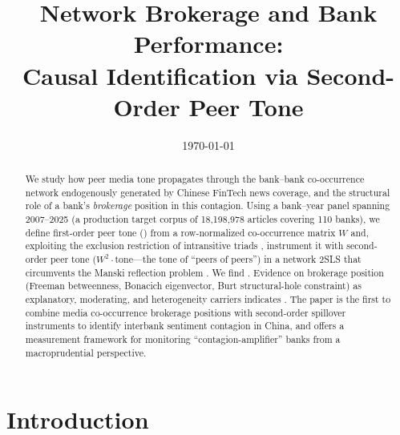 




\title{Network Brokerage and Bank Performance:\\Causal Identification via Second-Order Peer Tone}
\author{}
\date{\today}


\maketitle

\begin{abstract}
We study how peer media tone propagates through the bank--bank
co-occurrence network endogenously generated by Chinese FinTech news
coverage, and the structural role of a bank's \emph{brokerage}
position in this contagion. Using a bank--year panel spanning
2007--2025 (a production target corpus of 18{,}198{,}978 articles
covering 110 banks), we define first-order peer tone
() from a row-normalized co-occurrence
matrix $W$ and, exploiting the exclusion restriction of intransitive
triads \parencite{bramoulle2009identification}, instrument it with
second-order peer tone ($W^{2}\cdot\text{tone}$---the tone of
``peers of peers'') in a network 2SLS that circumvents the Manski
reflection problem \parencite{manski1993reflection}. We find
. Evidence on brokerage position
(Freeman betweenness, Bonacich eigenvector, Burt structural-hole
constraint) as explanatory, moderating, and heterogeneity carriers
indicates .
The paper is the first to combine media co-occurrence brokerage
positions with second-order spillover instruments to identify
interbank sentiment contagion in China, and offers a measurement
framework for monitoring ``contagion-amplifier'' banks from a
macroprudential perspective.
\end{abstract}

\section{Introduction}\label{sec:intro}

